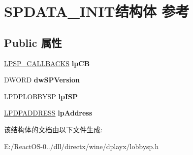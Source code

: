 \hypertarget{struct_s_p_d_a_t_a___i_n_i_t}{}\section{S\+P\+D\+A\+T\+A\+\_\+\+I\+N\+I\+T结构体 参考}
\label{struct_s_p_d_a_t_a___i_n_i_t}
\subsection*{Public 属性}
\begin{DoxyCompactItemize}
\item 
\mbox{\label{struct_s_p_d_a_t_a___i_n_i_t_a17a93e92dceca8037927fae48317f085}} 
\hyperlink{struct_s_p___c_a_l_l_b_a_c_k_s}{L\+P\+S\+P\+\_\+\+C\+A\+L\+L\+B\+A\+C\+KS} {\bfseries lp\+CB}
\item 
\mbox{\label{struct_s_p_d_a_t_a___i_n_i_t_a398b33f837ab9bafaabfad9ccb4ab8a4}} 
D\+W\+O\+RD {\bfseries dw\+S\+P\+Version}
\item 
\mbox{\label{struct_s_p_d_a_t_a___i_n_i_t_ab6f9fdfe7fb21febaec98c42c0344d2c}} 
L\+P\+D\+P\+L\+O\+B\+B\+Y\+SP {\bfseries lp\+I\+SP}
\item 
\mbox{\label{struct_s_p_d_a_t_a___i_n_i_t_a20b74f8379c7ac5db6c6b2a033086e2f}} 
\hyperlink{structtag_d_p_a_d_d_r_e_s_s}{L\+P\+D\+P\+A\+D\+D\+R\+E\+SS} {\bfseries lp\+Address}
\end{DoxyCompactItemize}


该结构体的文档由以下文件生成\+:\begin{DoxyCompactItemize}
\item 
E\+:/\+React\+O\+S-\/0../dll/directx/wine/dplayx/lobbysp.\+h\end{DoxyCompactItemize}
